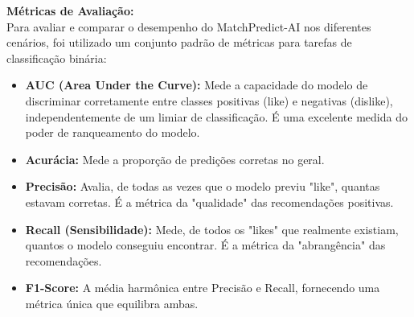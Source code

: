 \textbf{Métricas de Avaliação:} \\
Para avaliar e comparar o desempenho do MatchPredict-AI nos diferentes cenários, foi utilizado um conjunto padrão de métricas para tarefas de classificação binária:
\begin{itemize}
    \item \textbf{AUC (Area Under the Curve):} Mede a capacidade do modelo de discriminar corretamente entre classes positivas (like) e negativas (dislike), independentemente de um limiar de classificação. É uma excelente medida do poder de ranqueamento do modelo.
    \item \textbf{Acurácia:} Mede a proporção de predições corretas no geral.
    \item \textbf{Precisão:} Avalia, de todas as vezes que o modelo previu "like", quantas estavam corretas. É a métrica da "qualidade" das recomendações positivas.
    \item \textbf{Recall (Sensibilidade):} Mede, de todos os "likes" que realmente existiam, quantos o modelo conseguiu encontrar. É a métrica da "abrangência" das recomendações.
    \item \textbf{F1-Score:} A média harmônica entre Precisão e Recall, fornecendo uma métrica única que equilibra ambas.
\end{itemize}